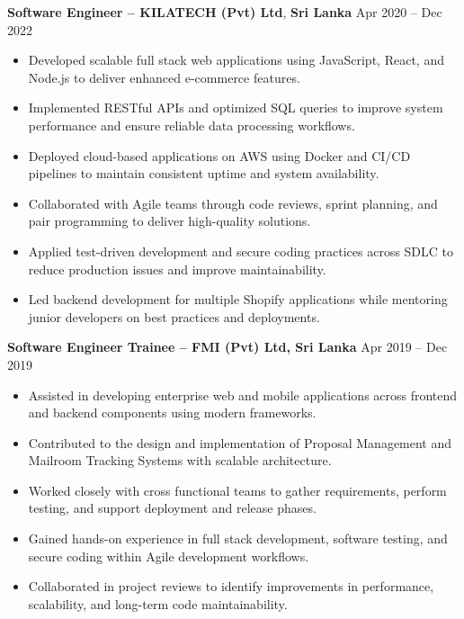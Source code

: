 \documentclass[10pt,letterpaper]{article}
\begin{document}
\vspace{-2pt}

\textbf{Software Engineer -- KILATECH (Pvt) Ltd}, \textbf{Sri Lanka} \hfill Apr 2020 -- Dec 2022

\vspace{-1pt}

\begin{itemize}
\item Developed scalable full stack web applications using JavaScript, React, and Node.js to deliver enhanced e-commerce features.
\item Implemented RESTful APIs and optimized SQL queries to improve system performance and ensure reliable data processing workflows.
\item Deployed cloud-based applications on AWS using Docker and CI/CD pipelines to maintain consistent uptime and system availability.
\item Collaborated with Agile teams through code reviews, sprint planning, and pair programming to deliver high-quality solutions.
\item Applied test-driven development and secure coding practices across SDLC to reduce production issues and improve maintainability.
\item Led backend development for multiple Shopify applications while mentoring junior developers on best practices and deployments.
\end{itemize}

\textbf{Software Engineer Trainee -- FMI (Pvt) Ltd, Sri Lanka} \hfill Apr 2019 -- Dec 2019

\vspace{-1pt}

\begin{itemize}
\item Assisted in developing enterprise web and mobile applications across frontend and backend components using modern frameworks.
\item Contributed to the design and implementation of Proposal Management and Mailroom Tracking Systems with scalable architecture.
\item Worked closely with cross functional teams to gather requirements, perform testing, and support deployment and release phases.
\item Gained hands-on experience in full stack development, software testing, and secure coding within Agile development workflows.
\item Collaborated in project reviews to identify improvements in performance, scalability, and long-term code maintainability.
\end{itemize}
\end{document}
